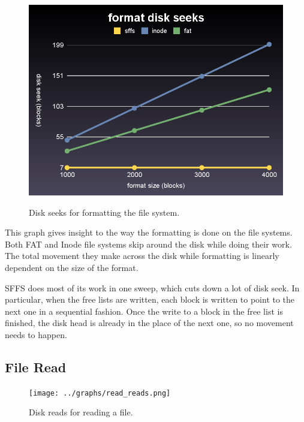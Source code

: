 \documentclass[10pt,twocolumn]{article}
\begin{document}
  \begin{figure}[h]
    \begin{center}
      \includegraphics[scale=0.2]{../graphs/format_seeks.png}
      \label{fig:delete_seeks}
      \caption{Disk seeks for formatting the file system.}
    \end{center}
  \end{figure}

  This graph gives insight to the way the formatting is done on the file 
  systems. Both FAT and Inode file systems skip around the disk while doing
  their work. The total movement they make across the disk while formatting is
  linearly dependent on the size of the format.

  SFFS does most of its work in one sweep, which cuts down a lot of disk seek. 
  In particular, when the free lists are written, each block is written to 
  point to the next one in a sequential fashion. Once the write to a block in 
  the free list is finished, the disk head is already in the place of the next 
  one, so no movement needs to happen.

  \subsection{File Read}
  \begin{figure}[h]
    \begin{center}
      \texttt{[image: ../graphs/read\_reads.png]}
      \label{fig:delete_seeks}
      \caption{Disk reads for reading a file.}
    \end{center}
  \end{figure}
\end{document}
